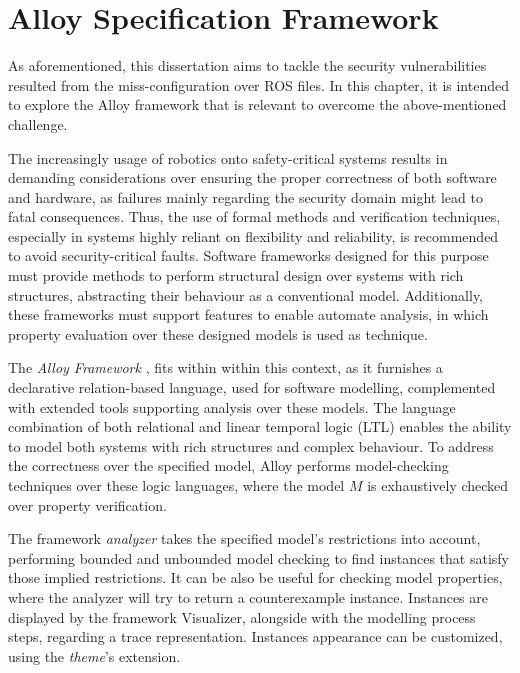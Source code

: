 \chapter{Alloy Specification Framework}\label{c:alloy}

As aforementioned, this dissertation aims to tackle the security vulnerabilities resulted from the miss-configuration over ROS files. In this chapter, it is intended to explore the Alloy framework that is relevant to overcome the above-mentioned challenge. %

The increasingly usage of robotics onto safety-critical systems results in demanding considerations over ensuring the proper correctness of both software and hardware, as failures mainly regarding the security domain might lead to fatal consequences. Thus, the use of formal methods and verification techniques, especially in systems highly reliant on flexibility and reliability, is recommended to avoid security-critical faults. \cite{carvalho2020analysis, clarke2011model} Software frameworks designed for this purpose must provide methods to perform structural design over systems with rich structures, abstracting their behaviour as a conventional model. Additionally, these frameworks must support features to enable automate analysis, in which property evaluation over these designed models is used as technique. 

The \textit{Alloy Framework} \cite{alloy-DJ}, fits within within this context, as it furnishes a declarative relation-based language, used for software modelling, complemented with extended tools supporting analysis over these models. \cite{alloy-6} The language combination of both relational and linear temporal logic (LTL) enables the ability to model both systems with rich structures and complex behaviour. To address the correctness over the specified model, Alloy performs model-checking techniques over these logic languages, where the model $M$ is exhaustively checked over property verification. \cite{lwspecification, carvalho2020analysis}

The framework \textit{analyzer} takes the specified model's restrictions into account, performing bounded and unbounded model checking to find instances that satisfy those implied restrictions. It can be also be useful for checking model properties, where the analyzer will try to return a counterexample instance. Instances are displayed by the framework Visualizer, alongside with the modelling process steps, regarding a trace representation. Instances appearance can be customized, using the \textit{theme}'s extension. \cite{alloy-6}

